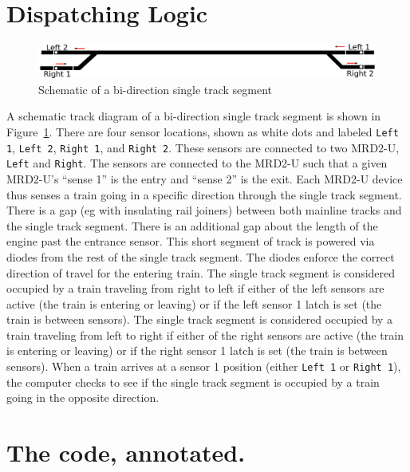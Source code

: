 \section{Dispatching Logic}

\begin{figure}[hbpt]
\begin{centering}
\includegraphics[width=5in]{singletrack-ink1.png}
\caption{Schematic of a bi-direction single track segment}
\label{fig:AutoDispatcher:singletrack-ink1}
\end{centering}
\end{figure}
A schematic track diagram of a bi-direction single track segment is
shown in Figure~\ref{fig:AutoDispatcher:singletrack-ink1}. There are
four sensor locations, shown as white dots and labeled \texttt{Left 1},
\texttt{Left 2}, \texttt{Right 1}, and \texttt{Right 2}.  These sensors
are connected to two MRD2-U, \texttt{Left} and \texttt{Right}. The
sensors are connected to the MRD2-U such that a given MRD2-U's ``sense
1'' is the entry and ``sense 2'' is the exit.  Each MRD2-U device thus
senses a train going in a specific direction through the single track
segment. There is a gap (eg with insulating rail joiners) between both
mainline tracks and the single track segment.  There is an additional
gap about the length of the engine past the entrance sensor.  This short
segment of track is powered via diodes from the rest of the single track
segment. The diodes enforce the correct direction of travel for the
entering train. The single track segment is considered occupied by a train
traveling from right to left if either of the left sensors are active
(the train is entering or leaving) or if the left sensor 1 latch is set
(the train is between sensors).  The  single track segment is
considered occupied by a train traveling from left to right if either
of the right sensors are active (the train is entering or leaving) or
if the right sensor 1 latch is set (the train is between sensors). 
When a train arrives at a sensor 1 position (either \texttt{Left 1} or
\texttt{Right 1}), the computer checks to see if the single track
segment is occupied by a train going in the opposite direction.



\section{The code, annotated.}



